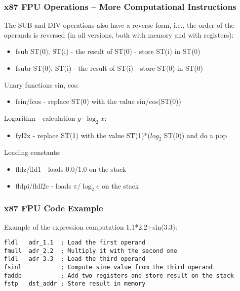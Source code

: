 \documentclass{beamer}
\begin{document}
\begin{frame}
\frametitle{x87 FPU Operations -- More Computational Instructions}
The SUB and DIV operations also have a reverse form, i.e., the order of the operands is reversed (in all versions, both with memory and with registers):
\begin{itemize}
\item fsub ST(0), ST(i) - the result of ST(0) - store ST(i) in ST(0)
\item fsubr ST(0), ST(i) - the result of ST(i) - store ST(0) in ST(0)
\end{itemize}

Unary functions sin, cos:
\begin{itemize}
\item fsin/fcos - replace ST(0) with the value sin/cos(ST(0))
\end{itemize}

Logarithm - calculation $y\cdot\log_2 x$:
\begin{itemize}
\item fyl2x - replace ST(1) with the value ST(1)*($log_2$ ST(0)) and do a pop
\end{itemize}

Loading constants:
\begin{itemize}
\item fldz/fld1 - loads 0.0/1.0 on the stack
\item fldpi/fldl2e - loads $\pi$/$\log_2 e$ on the stack
\end{itemize}

\end{frame}


\begin{frame}[fragile]
\frametitle{x87 FPU Code Example}
Example of the expression computation 1.1*2.2+sin(3.3):
\begin{lstlisting}[language={[x86masm]Assembler},columns=flexible]
fldl   adr_1.1  ; Load the first operand
fmull  adr_2.2  ; Multiply it with the second one
fldl   adr_3.3  ; Load the third operand
fsinl           ; Compute sine value from the third operand
faddp           ; Add two registers and store result on the stack
fstp   dst_addr ; Store result in memory
\end{lstlisting}

\end{frame}
\end{document}
